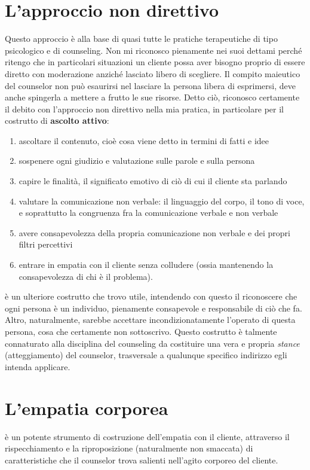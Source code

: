\section{L'approccio non direttivo}
\label{sec:nondirettivo}
Questo approccio è alla base di quasi tutte le pratiche terapeutiche di tipo psicologico e di counseling. Non mi riconosco pienamente nei suoi dettami perché ritengo che in particolari situazioni un cliente possa aver bisogno proprio di essere diretto con moderazione anziché lasciato libero di scegliere. Il compito maieutico del counselor non può esaurirsi nel lasciare la persona libera di esprimersi, deve anche spingerla a mettere a frutto le sue risorse.
Detto ciò, riconosco certamente il debito con l'approccio non direttivo nella mia pratica, in particolare per il costrutto di \textbf{ascolto attivo}:
\begin{enumerate}
\item ascoltare il contenuto, cioè cosa viene detto in termini di fatti e idee
\item sospenere ogni giudizio e valutazione sulle parole e sulla persona
\item capire le finalità, il significato emotivo di ciò di cui il cliente sta parlando
\item valutare la comunicazione non verbale: il linguaggio del corpo, il tono di voce, e soprattutto la congruenza fra la comunicazione verbale e non verbale
\item avere consapevolezza della propria comunicazione non verbale e dei propri filtri percettivi
\item entrare in empatia con il cliente senza colludere (ossia mantenendo la consapevolezza di chi è il problema).
\end{enumerate}

 è un ulteriore costrutto che trovo utile, intendendo con questo il riconoscere che ogni persona è un individuo, pienamente consapevole e responsabile di ciò che fa. Altro, naturalmente, sarebbe accettare incondizionatamente l'operato di questa persona, cosa che certamente non sottoscrivo. Questo costrutto è talmente connaturato alla disciplina del counseling da costituire una vera e propria \emph{stance} (atteggiamento) del counselor, trasversale a qualunque specifico indirizzo egli intenda applicare.

\section{L'empatia corporea}
\label{sec:empatia_corporea}
 è un potente strumento di costruzione dell'empatia con il cliente,  attraverso il rispecchiamento e la riproposizione (naturalmente non smaccata) di caratteristiche che il counselor trova salienti nell'agito corporeo del cliente.


